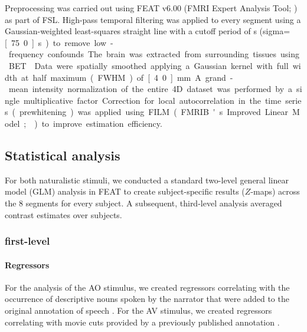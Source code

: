 \documentclass[english]{article}
\begin{document}
Preprocessing was carried out using FEAT v6.00 (FMRI Expert Analysis Tool;
\citep{woolrich2001autocorr}) as part of FSL.
High-pass temporal filtering was applied to every segment using a
Gaussian-weighted least-squares straight line with a cutoff period of
\unit[150]{s} (sigma=\unit[75.0]{s}) to remove low-frequency confounds.
The brain was extracted from surrounding tissues using BET \citep{smith2002bet}.
Data were spatially smoothed applying a Gaussian kernel with full width at half
maximum (FWHM) of \unit[4.0]{mm}.
A grand-mean intensity normalization of the entire 4D dataset was performed by a
single multiplicative factor.
Correction for local autocorrelation in the time series (prewhitening) was
applied using FILM (FMRIB's Improved Linear Model; \citep{woolrich2001autocorr})
to improve estimation efficiency.

\subsection{Statistical analysis}

For both naturalistic stimuli, we conducted a standard two-level general linear
model (GLM) analysis in FEAT to create subject-specific results ($Z$-maps)
across the 8 segments for every subject. A subsequent, third-level analysis averaged contrast estimates over subjects.


\subsubsection{first-level}

\paragraph{Regressors}


For the analysis of the AO stimulus, we created regressors correlating with the
occurrence of descriptive nouns spoken by the narrator that were added to the
original annotation of speech \citep{haeusler2020speechanno}.
For the AV stimulus, we created regressors correlating with movie cuts provided
by a previously published annotation \citep{haeusler2016cutanno}.
\end{document}
